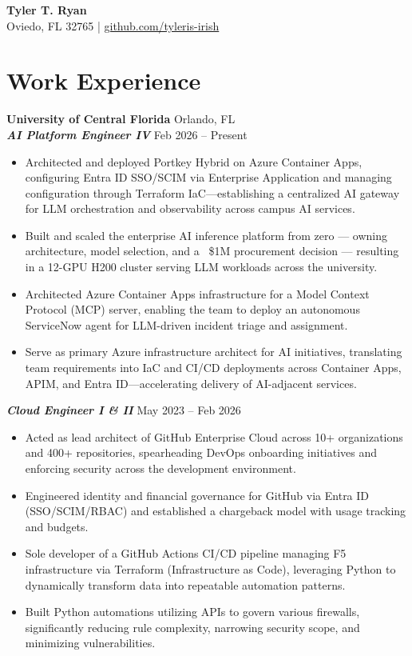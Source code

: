 \documentclass[10pt, letterpaper]{article}
\begin{document}
\begin{center}
    {\LARGE \textbf{Tyler T. Ryan}} \\
    \vspace{4pt}
    Oviedo, FL 32765 | \href{https://github.com/tyleris-irish}{github.com/tyleris-irish}
\end{center}

\section{Work Experience}

\textbf{University of Central Florida} \hfill Orlando, FL \\
\textbf{\textit{AI Platform Engineer IV}} \hfill Feb 2026 -- Present
\begin{itemize}
    \item Architected and deployed Portkey Hybrid on Azure Container Apps, configuring Entra ID SSO/SCIM via Enterprise Application and managing configuration through Terraform IaC---establishing a centralized AI gateway for LLM orchestration and observability across campus AI services.
    \item Built and scaled the enterprise AI inference platform from zero — owning architecture, model selection, and a ~\$1M procurement decision — resulting in a 12-GPU H200 cluster serving LLM workloads across the university.
    \item Architected Azure Container Apps infrastructure for a Model Context Protocol (MCP) server, enabling the team to deploy an autonomous ServiceNow agent for LLM-driven incident triage and assignment.
    \item Serve as primary Azure infrastructure architect for AI initiatives, translating team requirements into IaC and CI/CD deployments across Container Apps, APIM, and Entra ID---accelerating delivery of AI-adjacent services.
\end{itemize}

\vspace{5pt}
\textbf{\textit{Cloud Engineer I \& II}} \hfill May 2023 -- Feb 2026
\begin{itemize}
    \item Acted as lead architect of GitHub Enterprise Cloud across 10+ organizations and 400+ repositories, spearheading DevOps onboarding initiatives and enforcing security across the development environment.
    \item Engineered identity and financial governance for GitHub via Entra ID (SSO/SCIM/RBAC) and established a chargeback model with usage tracking and budgets.
    \item Sole developer of a GitHub Actions CI/CD pipeline managing F5 infrastructure via Terraform (Infrastructure as Code), leveraging Python to dynamically transform data into repeatable automation patterns.
    \item Built Python automations utilizing APIs to govern various firewalls, significantly reducing rule complexity, narrowing security scope, and minimizing vulnerabilities.
\end{itemize}
\end{document}
